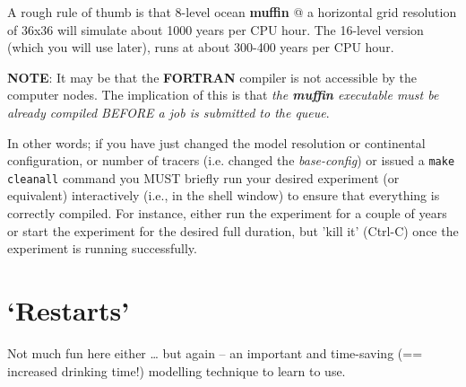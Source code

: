\documentclass[11pt,fleqn]{book} %
\begin{document}
A rough rule of thumb is that 8-level ocean \textbf{muffin} @ a horizontal grid resolution of 36x36 will simulate about 1000 years per CPU hour. The 16-level version (which you will use later), runs at about 300-400 years per CPU hour.

\noindent \textbf{NOTE}: It may be that the \textbf{FORTRAN} compiler is not accessible by the computer nodes. The implication of this is that \textit{the \textbf{muffin} executable must be already compiled BEFORE a job is submitted to the queue}.

\noindent In other words; if you have just changed the model resolution or continental configuration, or number of tracers (i.e. changed the \textit{base-config}) or issued a \texttt{make cleanall} command you MUST briefly run your desired experiment (or equivalent) interactively (i.e., in the shell window) to ensure that everything is correctly compiled. For instance, either run the experiment for a couple of years or start the experiment for the desired full duration, but 'kill it' (Ctrl-C) once the experiment is running successfully.


\newpage


\section{‘Restarts’}

Not much fun here either … but again – an important and time-saving (== increased drinking time!) modelling technique to learn to use.
\end{document}
